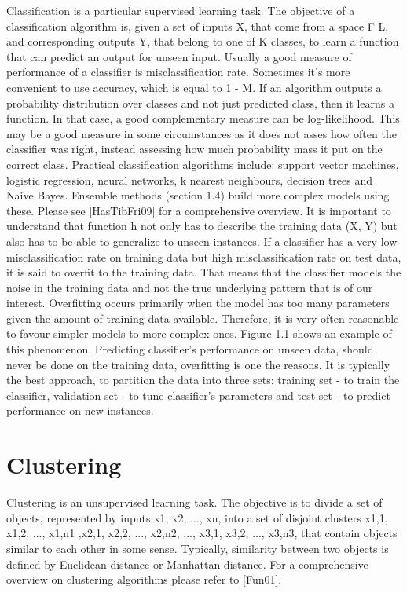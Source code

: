 \documentclass[a4paper,12pt,times,numbered,print,index]{Classes/PhDThesisPSnPDF}
\begin{document}
Classification is a particular supervised learning task. The objective of a classification algorithm
is, given a set of inputs X, that come from a space F
L, and corresponding outputs Y,
that belong to one of K classes, to learn a function that can predict an output for unseen input.
Usually a good measure of performance of a classifier is misclassification rate.
Sometimes it’s more convenient to use accuracy, which is equal to 1 - M.
If an algorithm outputs a probability distribution over classes and not just predicted class,
then it learns a function. In that case, a good complementary measure can be log-likelihood.
This may be a good measure in some circumstances as it does not asses how often the classifier
was right, instead assessing how much probability mass it put on the correct class.
Practical classification algorithms include: support vector machines, logistic regression,
neural networks, k nearest neighbours, decision trees and Naive Bayes. Ensemble methods
(section 1.4) build more complex models using these. Please see [HasTibFri09] for a comprehensive
overview.
It is important to understand that function h not only has to describe the training data
(X, Y) but also has to be able to generalize to unseen instances. If a classifier has a very
low misclassification rate on training data but high misclassification rate on test data, it
is said to overfit to the training data. That means that the classifier models the noise in
the training data and not the true underlying pattern that is of our interest. Overfitting
occurs primarily when the model has too many parameters given the amount of training data
available. Therefore, it is very often reasonable to favour simpler models to more complex
ones. Figure 1.1 shows an example of this phenomenon.
Predicting classifier’s performance on unseen data, should never be done on the training
data, overfitting is one the reasons. It is typically the best approach, to partition the data into
three sets: training set - to train the classifier, validation set - to tune classifier’s parameters
and test set - to predict performance on new instances.

\section{Clustering}

Clustering is an unsupervised learning task. The objective is to divide a set of objects,
represented by inputs {x1, x2, ..., xn}, into a set of disjoint clusters {{x1,1, x1,2, ..., x1,n1
},{x2,1, x2,2, ..., x2,n2}, ..., {x3,1, x3,2, ..., x3,n3}}, that contain objects similar to each other
in some sense. Typically, similarity between two objects is defined by Euclidean distance or Manhattan distance.
For a comprehensive overview on clustering algorithms please refer to [Fun01].
\end{document}
